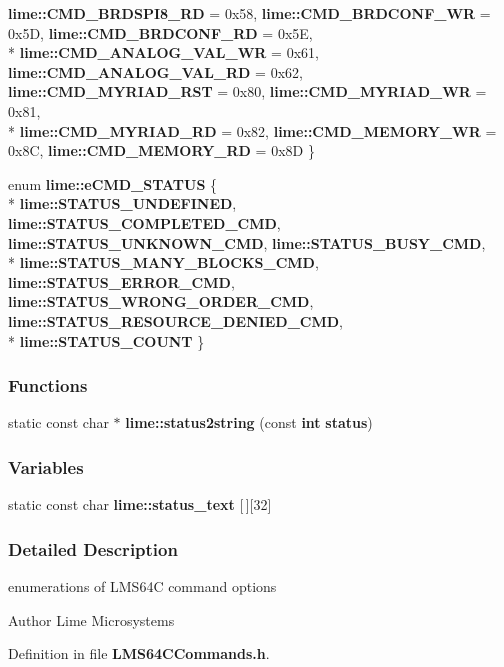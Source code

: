 \begin{DoxyCompactItemize}
{\bf lime\+::\+C\+M\+D\+\_\+\+B\+R\+D\+S\+P\+I8\+\_\+\+RD} = 0x58, 
{\bf lime\+::\+C\+M\+D\+\_\+\+B\+R\+D\+C\+O\+N\+F\+\_\+\+WR} = 0x5D, 
{\bf lime\+::\+C\+M\+D\+\_\+\+B\+R\+D\+C\+O\+N\+F\+\_\+\+RD} = 0x5E, 
\\*
{\bf lime\+::\+C\+M\+D\+\_\+\+A\+N\+A\+L\+O\+G\+\_\+\+V\+A\+L\+\_\+\+WR} = 0x61, 
{\bf lime\+::\+C\+M\+D\+\_\+\+A\+N\+A\+L\+O\+G\+\_\+\+V\+A\+L\+\_\+\+RD} = 0x62, 
{\bf lime\+::\+C\+M\+D\+\_\+\+M\+Y\+R\+I\+A\+D\+\_\+\+R\+ST} = 0x80, 
{\bf lime\+::\+C\+M\+D\+\_\+\+M\+Y\+R\+I\+A\+D\+\_\+\+WR} = 0x81, 
\\*
{\bf lime\+::\+C\+M\+D\+\_\+\+M\+Y\+R\+I\+A\+D\+\_\+\+RD} = 0x82, 
{\bf lime\+::\+C\+M\+D\+\_\+\+M\+E\+M\+O\+R\+Y\+\_\+\+WR} = 0x8C, 
{\bf lime\+::\+C\+M\+D\+\_\+\+M\+E\+M\+O\+R\+Y\+\_\+\+RD} = 0x8D
 \}
\item 
enum {\bf lime\+::e\+C\+M\+D\+\_\+\+S\+T\+A\+T\+US} \{ \\*
{\bf lime\+::\+S\+T\+A\+T\+U\+S\+\_\+\+U\+N\+D\+E\+F\+I\+N\+ED}, 
{\bf lime\+::\+S\+T\+A\+T\+U\+S\+\_\+\+C\+O\+M\+P\+L\+E\+T\+E\+D\+\_\+\+C\+MD}, 
{\bf lime\+::\+S\+T\+A\+T\+U\+S\+\_\+\+U\+N\+K\+N\+O\+W\+N\+\_\+\+C\+MD}, 
{\bf lime\+::\+S\+T\+A\+T\+U\+S\+\_\+\+B\+U\+S\+Y\+\_\+\+C\+MD}, 
\\*
{\bf lime\+::\+S\+T\+A\+T\+U\+S\+\_\+\+M\+A\+N\+Y\+\_\+\+B\+L\+O\+C\+K\+S\+\_\+\+C\+MD}, 
{\bf lime\+::\+S\+T\+A\+T\+U\+S\+\_\+\+E\+R\+R\+O\+R\+\_\+\+C\+MD}, 
{\bf lime\+::\+S\+T\+A\+T\+U\+S\+\_\+\+W\+R\+O\+N\+G\+\_\+\+O\+R\+D\+E\+R\+\_\+\+C\+MD}, 
{\bf lime\+::\+S\+T\+A\+T\+U\+S\+\_\+\+R\+E\+S\+O\+U\+R\+C\+E\+\_\+\+D\+E\+N\+I\+E\+D\+\_\+\+C\+MD}, 
\\*
{\bf lime\+::\+S\+T\+A\+T\+U\+S\+\_\+\+C\+O\+U\+NT}
 \}
\end{DoxyCompactItemize}
\subsubsection*{Functions}
\begin{DoxyCompactItemize}
\item 
static const char $\ast$ {\bf lime\+::status2string} (const {\bf int} {\bf status})
\end{DoxyCompactItemize}
\subsubsection*{Variables}
\begin{DoxyCompactItemize}
\item 
static const char {\bf lime\+::status\+\_\+text} [$\,$][32]
\end{DoxyCompactItemize}


\subsubsection{Detailed Description}
enumerations of L\+M\+S64C command options 

\begin{DoxyAuthor}{Author}
Lime Microsystems 
\end{DoxyAuthor}


Definition in file {\bf L\+M\+S64\+C\+Commands.\+h}.

